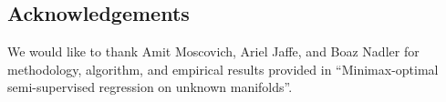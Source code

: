 \documentclass[a0,landscape]{a0poster}
\begin{document}
\begin{multicols}{4}

\section*{Acknowledgements}
We would like to thank Amit Moscovich, Ariel Jaffe, and Boaz Nadler for methodology, algorithm, and empirical results provided in ``Minimax-optimal semi-supervised regression on unknown manifolds''.


\end{multicols}
\end{document}
